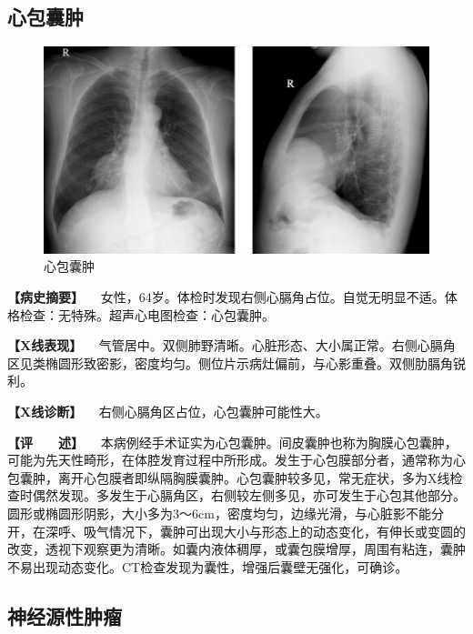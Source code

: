 \subsection{心包囊肿}

\begin{figure}[!htbp]
 \centering
 \includegraphics{./images/Image00199.jpg}
 \captionsetup{justification=centering}
 \caption{心包囊肿}
 \label{fig3-12-6}
  \end{figure} 

\textbf{【病史摘要】}
　女性，64岁。体检时发现右侧心膈角占位。自觉无明显不适。体格检查：无特殊。超声心电图检查：心包囊肿。

\textbf{【X线表现】}
　气管居中。双侧肺野清晰。心脏形态、大小属正常。右侧心膈角区见类椭圆形致密影，密度均匀。侧位片示病灶偏前，与心影重叠。双侧肋膈角锐利。

\textbf{【X线诊断】} 　右侧心膈角区占位，心包囊肿可能性大。

\textbf{【评　　述】}
　本病例经手术证实为心包囊肿。间皮囊肿也称为胸膜心包囊肿，可能为先天性畸形，在体腔发育过程中所形成。发生于心包膜部分者，通常称为心包囊肿，离开心包膜者即纵隔胸膜囊肿。心包囊肿较多见，常无症状，多为X线检查时偶然发现。多发生于心膈角区，右侧较左侧多见，亦可发生于心包其他部分。圆形或椭圆形阴影，大小多为3～6cm，密度均匀，边缘光滑，与心脏影不能分开，在深呼、吸气情况下，囊肿可出现大小与形态上的动态变化，有伸长或变圆的改变，透视下观察更为清晰。如囊内液体稠厚，或囊包膜增厚，周围有粘连，囊肿不易出现动态变化。CT检查发现为囊性，增强后囊壁无强化，可确诊。

\subsection{神经源性肿瘤}

